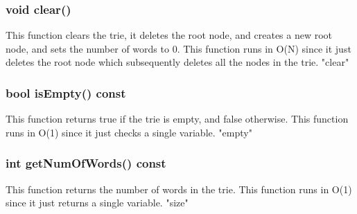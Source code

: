 \subsubsection{{\color{orange}void} {\color{draculapurple}clear}()}
This function clears the trie, it deletes the root node, and creates a new root node, and sets the number of words to 0. This function runs in {\color{lightblue}O(N)} since it just deletes the root node which subsequently deletes all the nodes in the trie.
{\color{GoldenYellow}"clear"}




\subsubsection{{\color{orange}bool} {\color{draculapurple}isEmpty}() {\color{GoldenYellow} const}}
This function returns true if the trie is empty, and false otherwise. This function runs in {\color{lightblue}O(1)} since it just checks a single variable.
{\color{GoldenYellow}"empty"}

\subsubsection{{\color{orange}int} {\color{draculapurple}getNumOfWords}() {\color{GoldenYellow} const}}
This function returns the number of words in the trie. This function runs in {\color{lightblue}O(1)} since it just returns a single variable.
{\color{GoldenYellow}"size"}































